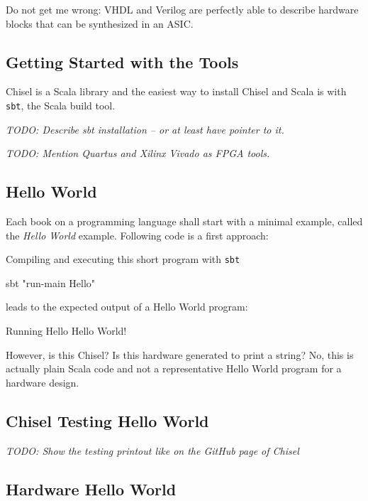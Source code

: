 \documentclass[a4paper]{article}
\newcommand{\code}[1]{{\small{\texttt{#1}}}}
\newcommand{\todo}[1]{{\emph{TODO: #1}}}
\begin{document}
Do not get me wrong: VHDL and Verilog are perfectly able to describe hardware
blocks that can be synthesized in an ASIC.

\subsection{Getting Started with the Tools}

Chisel is a Scala library and the easiest way to install Chisel and Scala is
with \code{sbt}, the Scala build tool.

\todo{Describe sbt installation -- or at least have pointer to it.}

\todo{Mention Quartus and Xilinx Vivado as FPGA tools.}

\subsection{Hello World}

Each book on a programming language shall start with a minimal example,
called the \emph{Hello World} example. Following code is a first approach:





Compiling and executing this short program with \code{sbt}

\begin{chisel}
sbt "run-main Hello"
\end{chisel}

leads to the expected output of a Hello World program:

\begin{chisel}
[info] Running Hello 
Hello World!
\end{chisel}

However, is this Chisel? Is this hardware generated to print a string?
No, this is actually plain Scala code and not a representative Hello World
program for a hardware design.

\subsection{Chisel Testing Hello World}

\todo{Show the testing printout like on the GitHub page of Chisel}

\subsection{Hardware Hello World}
\end{document}
